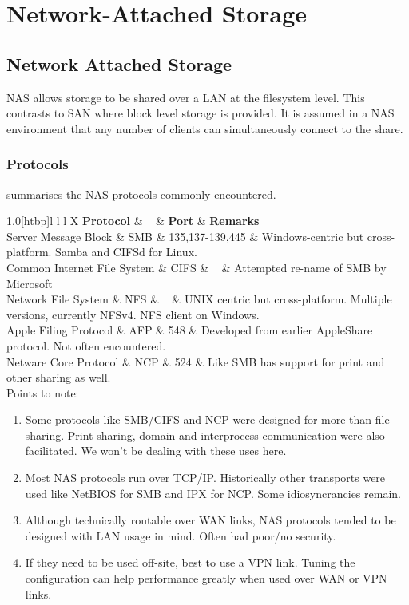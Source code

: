 \chapter{Network-Attached Storage}
\label{ch:network-attached-storage}

\section{Network Attached Storage}\label{network-attached-storage}

NAS allows storage to be shared over a LAN at the filesystem level. This
contrasts to SAN where block level storage is provided. It is assumed in
a NAS environment that any number of clients can simultaneously connect
to the share.

\subsection{Protocols}\label{protocols}

summarises the NAS protocols commonly encountered.

{1.0}{[}htbp{]}{l l l X} \textbf{Protocol} \& ~ \& \textbf{Port} \&
\textbf{Remarks}\\
Server Message Block \& SMB \& 135,137-139,445 \& Windows-centric but
cross-platform. Samba and CIFSd for Linux.\\
Common Internet File System \& CIFS \& ~ \& Attempted re-name of SMB by
Microsoft\\
Network File System \& NFS \& ~ \& UNIX centric but cross-platform.
Multiple versions, currently NFSv4. NFS client on Windows.\\
Apple Filing Protocol \& AFP \& 548 \& Developed from earlier AppleShare
protocol. Not often encountered.\\
Netware Core Protocol \& NCP \& 524 \& Like SMB has support for print
and other sharing as well.\\
Points to note:

\begin{enumerate}
\def\labelenumi{\arabic{enumi}.}
\item
  Some protocols like SMB/CIFS and NCP were designed for more than file
  sharing. Print sharing, domain and interprocess communication were
  also facilitated. We won't be dealing with these uses here.
\item
  Most NAS protocols run over TCP/IP. Historically other transports were
  used like NetBIOS for SMB and IPX for NCP. Some idiosyncrancies
  remain.
\item
  Although technically routable over WAN links, NAS protocols tended to
  be designed with LAN usage in mind. Often had poor/no security.
\item
  If they need to be used off-site, best to use a VPN link. Tuning the
  configuration can help performance greatly when used over WAN or VPN
  links.
\end{enumerate}


